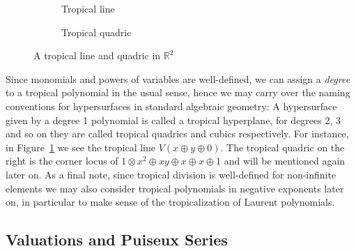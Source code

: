 \documentclass[
  paper=a4,
  titlepage,
  bibliography=totoc,
  listof=totoc,
  pagesize=pdftex
]{scrartcl}
\numberwithin{figure}{section}
\numberwithin{equation}{section}
\numberwithin{table}{section}
\newcommand*\setR{\mathds{R}}
\theoremstyle{definition}
\numberwithin{definition}{section}
\begin{document}
\begin{figure}[tbh]
  \centering
  \begin{subfigure}{0.49\textwidth}
    \centering
    \caption{Tropical line}
    \label{fig:trop:line}
  \end{subfigure}
  \begin{subfigure}{0.49\textwidth}
    \centering
    \caption{Tropical quadric}
    \label{fig:trop:quad}
  \end{subfigure}
  \caption{A tropical line and quadric in $\setR^2$}
  \label{fig:tropLineQuad}
\end{figure}

Since monomials and powers of variables are well-defined, we can assign a \emph{degree} to
a tropical polynomial in the usual sense, hence we may carry over the naming conventions
for hypersurfaces in standard algebraic geometry: A hypersurface given by a degree 1
polynomial is called a tropical hyperplane, for degrees 2, 3 and so on they are called
tropical quadrics and cubics respectively. For instance, in Figure~\ref{fig:trop:line} we
see the tropical line $V(x \oplus y \oplus 0)$. The tropical quadric on the right is the
corner locus of $1\otimes x^2 \oplus xy \oplus x \oplus x \oplus 1$ and will be mentioned
again later on. As a final note, since tropical division is well-defined for non-infinite
elements we may also consider tropical polynomials in negative exponents later on, in
particular to make sense of the tropicalization of Laurent polynomials.

\subsection{Valuations and Puiseux Series}
\end{document}
